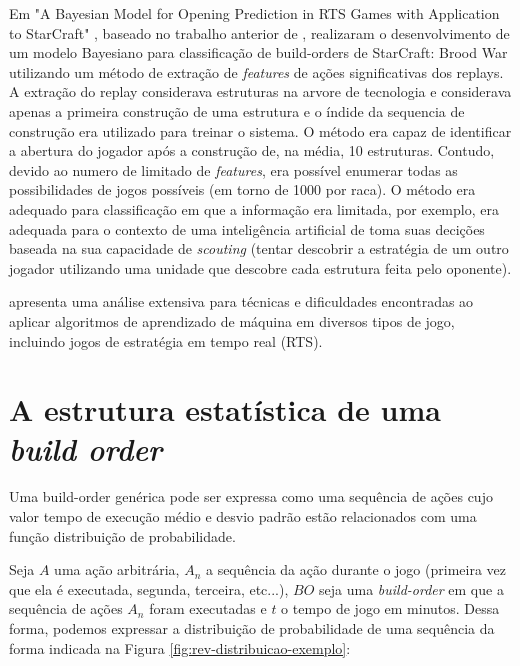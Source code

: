 Em "A Bayesian Model for Opening Prediction in RTS Games with Application to StarCraft"  \cite{synnaeve2011bayesian1}, baseado no trabalho anterior de \cite{weber2009data}, realizaram o desenvolvimento de um modelo Bayesiano para classificação de \glspl{build-order} de StarCraft: Brood War utilizando um método de extração de \textit{features} de ações significativas dos \glspl{replay}. A extração do \gls{replay} considerava \glspl{estrutura} na arvore de tecnologia e considerava apenas a primeira construção de uma \gls{estrutura} e o índide da sequencia de construção era utilizado para treinar o sistema. O método era capaz de identificar a abertura do jogador após a construção de, na média, 10 \glspl{estrutura}. Contudo, devido ao numero de limitado de \textit{features}, era possível enumerar todas as possibilidades de jogos possíveis (em torno de 1000 por \gls{raca}). O método era adequado para classificação em que a informação era limitada, por exemplo, era adequada para o contexto de uma inteligência artificial de toma suas decições baseada na sua capacidade de \textit{scouting} (tentar descobrir a estratégia de um outro jogador utilizando uma \gls{unidade} que descobre cada \gls{estrutura} feita pelo oponente).

\cite{synnaeve2011bayesian2} apresenta uma análise extensiva para técnicas e dificuldades encontradas ao aplicar algoritmos de aprendizado de máquina em diversos tipos de jogo, incluindo jogos de estratégia em tempo real (RTS).

		\section{A estrutura estatística de uma \textit{build order}}
Uma \gls{build-order} genérica pode ser expressa como uma sequência de ações cujo valor tempo de execução médio e desvio padrão estão relacionados com uma função distribuição de probabilidade.

Seja $A$ uma ação arbitrária, $A_n$ a sequência da ação durante o jogo (primeira vez que ela é executada, segunda, terceira, etc...), $BO$ seja uma \textit{\gls{build-order}} em que a sequência de ações $A_n$ foram executadas e $t$ o tempo de jogo em minutos. Dessa forma, podemos expressar a distribuição de probabilidade de uma sequência da forma indicada na Figura \ref{fig:rev-distribuicao-exemplo}:

